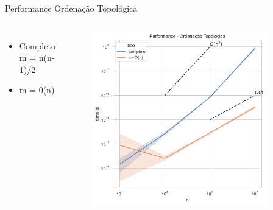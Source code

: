 \documentclass[aspectratio=169,usenames,dvipsnames]{beamer}
\begin{document}
\begin{frame}{Performance Ordenação Topológica}
  \begin{columns}
    
    \begin{itemize}
      \item Completo m = n(n-1)/2 
      \item m = 0(n)
    \end{itemize}


    \begin{figure}[ht]
    \centering
    \includegraphics[width=0.9\textwidth]{figs/topological_order_time.pdf}
    \end{figure}

  \end{columns}
\end{frame}
\end{document}
